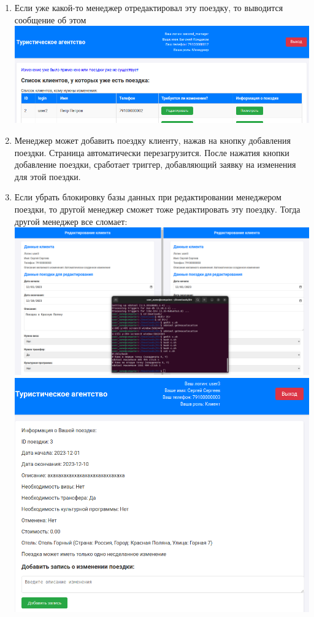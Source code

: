 \documentclass[a4paper,12pt]{article}
\begin{document}
\begin{enumerate}
    \item Если уже какой-то менеджер отредактировал эту поездку, то выводится сообщение об этом \\
          \includegraphics[scale=0.5]{media/manager/done.png} \\
    \item Менеджер может добавить поездку клиенту, нажав на кнопку добавления поездки. Страница автоматически перезагрузится.
          После нажатия кнопки добавление поездки, сработает триггер, добавляющий заявку на изменения для этой поездки.
    \item Если убрать блокировку базы данных при редактировании менеджером поездки, то другой менеджер сможет тоже редактировать эту поездку.
          Тогда другой менеджер все сломает: \\
          \includegraphics[scale=0.2]{media/manager/brake1.png} \\
          \includegraphics[scale=0.5]{media/manager/brake2.png} \\

\end{enumerate}
\end{document}
